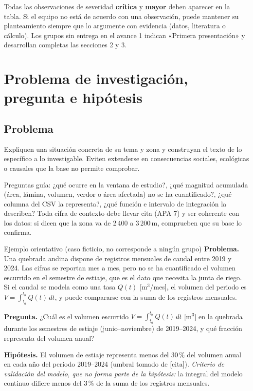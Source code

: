 \documentclass[11pt,a4paper]{article}
\begin{document}
Todas las observaciones de severidad \textbf{crítica} y \textbf{mayor} deben aparecer en la tabla. Si el equipo no está de acuerdo con una observación, puede mantener su planteamiento siempre que lo argumente con evidencia (datos, literatura o cálculo). Los grupos sin entrega en el avance 1 indican «Primera presentación» y desarrollan completas las secciones 2 y 3.

\section{Problema de investigación, pregunta e hipótesis}

\subsection*{Problema}
Expliquen una situación concreta de su tema y zona y construyan el texto de lo específico a lo investigable. Eviten extenderse en consecuencias sociales, ecológicas o causales que la base no permite comprobar.

\begin{center}
\end{center}

Preguntas guía: ¿qué ocurre en la ventana de estudio?, ¿qué magnitud acumulada (área, lámina, volumen, verdor o área afectada) no se ha cuantificado?, ¿qué columna del CSV la representa?, ¿qué función e intervalo de integración la describen? Toda cifra de contexto debe llevar cita (APA 7) y ser coherente con los datos: si dicen que la zona va de 2\,400 a 3\,200\,m, comprueben que su base lo confirma.

\begin{ejemplo}{Ejemplo orientativo (caso ficticio, no corresponde a ningún grupo)}
\textbf{Problema.} Una quebrada andina dispone de registros mensuales de caudal entre 2019 y 2024. Las cifras se reportan mes a mes, pero no se ha cuantificado el volumen escurrido en el semestre de estiaje, que es el dato que necesita la junta de riego. Si el caudal se modela como una tasa $Q(t)$ [m$^3$/mes], el volumen del periodo es $V=\int_{t_a}^{t_b} Q(t)\,dt$, y puede compararse con la suma de los registros mensuales.

\textbf{Pregunta.} ¿Cuál es el volumen escurrido $V=\int_{t_a}^{t_b}Q(t)\,dt$ [m$^3$] en la quebrada durante los semestres de estiaje (junio--noviembre) de 2019--2024, y qué fracción representa del volumen anual?

\textbf{Hipótesis.} El volumen de estiaje representa menos del 30\,\% del volumen anual en cada año del periodo 2019--2024 (umbral tomado de [cita]). \emph{Criterio de validación del modelo, que no forma parte de la hipótesis:} la integral del modelo continuo difiere menos del 3\,\% de la suma de los registros mensuales.
\end{ejemplo}
\end{document}
